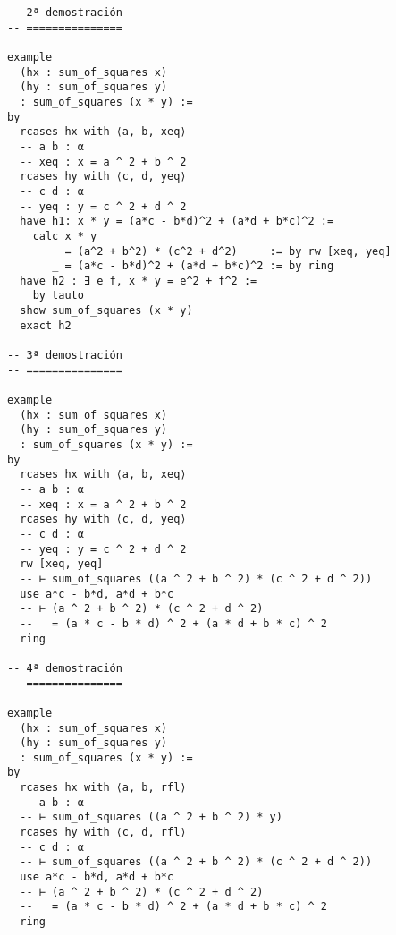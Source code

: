 \begin{verbatim}
-- 2ª demostración
-- ===============

example
  (hx : sum_of_squares x)
  (hy : sum_of_squares y)
  : sum_of_squares (x * y) :=
by
  rcases hx with ⟨a, b, xeq⟩
  -- a b : α
  -- xeq : x = a ^ 2 + b ^ 2
  rcases hy with ⟨c, d, yeq⟩
  -- c d : α
  -- yeq : y = c ^ 2 + d ^ 2
  have h1: x * y = (a*c - b*d)^2 + (a*d + b*c)^2 :=
    calc x * y
         = (a^2 + b^2) * (c^2 + d^2)     := by rw [xeq, yeq]
       _ = (a*c - b*d)^2 + (a*d + b*c)^2 := by ring
  have h2 : ∃ e f, x * y = e^2 + f^2 :=
    by tauto
  show sum_of_squares (x * y)
  exact h2

-- 3ª demostración
-- ===============

example
  (hx : sum_of_squares x)
  (hy : sum_of_squares y)
  : sum_of_squares (x * y) :=
by
  rcases hx with ⟨a, b, xeq⟩
  -- a b : α
  -- xeq : x = a ^ 2 + b ^ 2
  rcases hy with ⟨c, d, yeq⟩
  -- c d : α
  -- yeq : y = c ^ 2 + d ^ 2
  rw [xeq, yeq]
  -- ⊢ sum_of_squares ((a ^ 2 + b ^ 2) * (c ^ 2 + d ^ 2))
  use a*c - b*d, a*d + b*c
  -- ⊢ (a ^ 2 + b ^ 2) * (c ^ 2 + d ^ 2)
  --   = (a * c - b * d) ^ 2 + (a * d + b * c) ^ 2
  ring

-- 4ª demostración
-- ===============

example
  (hx : sum_of_squares x)
  (hy : sum_of_squares y)
  : sum_of_squares (x * y) :=
by
  rcases hx with ⟨a, b, rfl⟩
  -- a b : α
  -- ⊢ sum_of_squares ((a ^ 2 + b ^ 2) * y)
  rcases hy with ⟨c, d, rfl⟩
  -- c d : α
  -- ⊢ sum_of_squares ((a ^ 2 + b ^ 2) * (c ^ 2 + d ^ 2))
  use a*c - b*d, a*d + b*c
  -- ⊢ (a ^ 2 + b ^ 2) * (c ^ 2 + d ^ 2)
  --   = (a * c - b * d) ^ 2 + (a * d + b * c) ^ 2
  ring
\end{verbatim}

